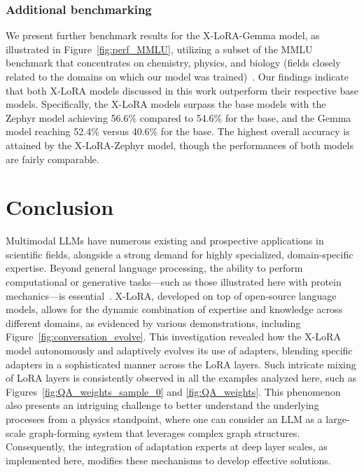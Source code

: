 \subsubsection{Additional benchmarking} We present further benchmark results for the X-LoRA-Gemma model, as illustrated in Figure~\ref{fig:perf_MMLU}, utilizing a subset of the MMLU benchmark that concentrates on chemistry, physics, and biology (fields closely related to the domains on which our model was trained)~\cite{Hendrycks2020MeasuringUnderstanding}. Our findings indicate that both X-LoRA models discussed in this work outperform their respective base models. Specifically, the X-LoRA models surpass the base models with the Zephyr model achieving 56.6\% compared to 54.6\% for the base, and the Gemma model reaching 52.4\% versus 40.6\% for the base. The highest overall accuracy is attained by the X-LoRA-Zephyr model, though the performances of both models are fairly comparable.

\section{Conclusion}

Multimodal LLMs have numerous existing and prospective applications in scientific fields, alongside a strong demand for highly specialized, domain-specific expertise. Beyond general language processing, the ability to perform computational or generative tasks—such as those illustrated here with protein mechanics—is essential~\cite{Luu2023BioinspiredLLM:Materials,Buehler2023MechGPTModalities,Buehler2023MeLMProblemsb}. X-LoRA, developed on top of open-source language models, allows for the dynamic combination of expertise and knowledge across different domains, as evidenced by various demonstrations, including Figure~\ref{fig:conversation_evolve}. This investigation revealed how the X-LoRA model autonomously and adaptively evolves its use of adapters, blending specific adapters in a sophisticated manner across the LoRA layers. Such intricate mixing of LoRA layers is consistently observed in all the examples analyzed here, such as Figures~\ref{fig:QA_weights_sample_0} and \ref{fig:QA_weights}. This phenomenon also presents an intriguing challenge to better understand the underlying processes from a physics standpoint, where one can consider an LLM as a large-scale graph-forming system that leverages complex graph structures. Consequently, the integration of adaptation experts at deep layer scales, as implemented here, modifies these mechanisms to develop effective solutions.


